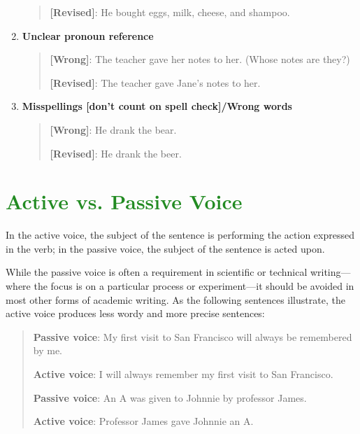 \documentclass[12pt, hidelinks]{article} %
\begin{document}
\begin{enumerate}
\begin{quote}
\textbf{[Revised]}: He bought eggs, milk, cheese, and shampoo. 
\end{quote}


\item \textbf{Unclear pronoun reference}
\begin{quote}
\textbf{[Wrong]}: The teacher gave her notes to her. (Whose notes are they?)

\textbf{[Revised]}: The teacher gave Jane's notes to her.
\end{quote}
\item \textbf{Misspellings [don't count on spell check]/Wrong words}
\begin{quote}
\textbf{[Wrong]}: He drank the bear.

\textbf{[Revised]}: He drank the beer.
\end{quote}
\end{enumerate}


\section{\textcolor{ForestGreen}{Active vs. Passive Voice}}



In the active voice, the subject of the sentence is performing the action expressed in the verb; in the passive voice, the subject of the sentence is acted upon. 

While the passive voice is often a requirement in scientific or technical writing---where the focus is on a particular process or experiment---it should be avoided in most other forms of academic writing. As the following sentences illustrate, the active voice produces less wordy and more precise sentences:

\begin{quote}
 
\textbf{Passive voice}: My first visit to San Francisco will always be remembered by me.

\textbf{Active voice}: I will always remember my first visit to San Francisco.

\textbf{Passive voice}: 	An A was given to Johnnie by professor James.

\textbf{Active voice}: 	Professor James gave Johnnie an A.
\end{quote}
\end{document}
